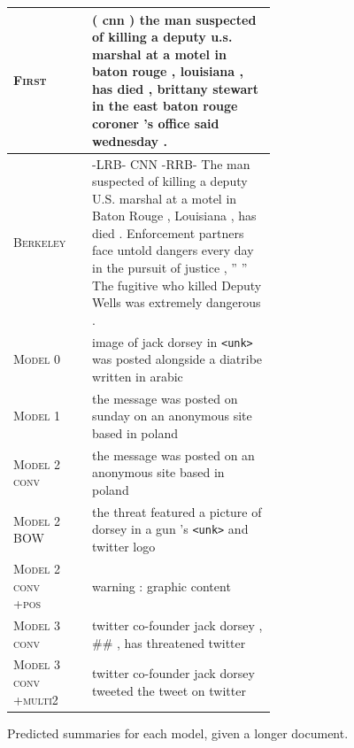 \documentclass[12pt]{report}
\begin{document}
\begin{figure}[p]
\begin{tabular}{ll p{0.7\linewidth}}
\midrule
\textsc{First} & & ( cnn ) the man suspected of killing a deputy u.s. marshal at a motel in baton rouge , louisiana , has died , brittany stewart in the east baton rouge coroner 's office said wednesday .\\
 \midrule
\textsc{Berkeley} & & -LRB- CNN -RRB- The man suspected of killing a deputy U.S. marshal at a motel in Baton Rouge , Louisiana , has died . Enforcement partners face untold dangers every day in the pursuit of justice , '' '' The fugitive who killed Deputy Wells was extremely dangerous . \\
\midrule

\textsc{Model 0} & & image of jack dorsey in \texttt{<unk>} was posted alongside a diatribe written in arabic \\
\midrule
 \textsc{Model 1} & & the message was posted on sunday on an anonymous site based in poland \\
\midrule
\textsc{Model 2 conv} & & the message was posted on an anonymous site based in poland \\
\textsc{Model 2 BOW} & &  the threat featured a picture of dorsey in a gun 's \texttt{<unk>} and twitter logo \\
\textsc{Model 2 conv +pos} & & warning : graphic content \\
\midrule
\textsc{Model 3 conv} & & twitter co-founder jack dorsey , \#\# , has threatened twitter \\
\textsc{Model 3 conv +multi2} & &  twitter co-founder jack dorsey tweeted the tweet on twitter \\
\bottomrule
\end{tabular}
\caption{Predicted summaries for each model, given a longer document.}
\label{fig:predicted_summaries}
\end{figure}
\end{document}
